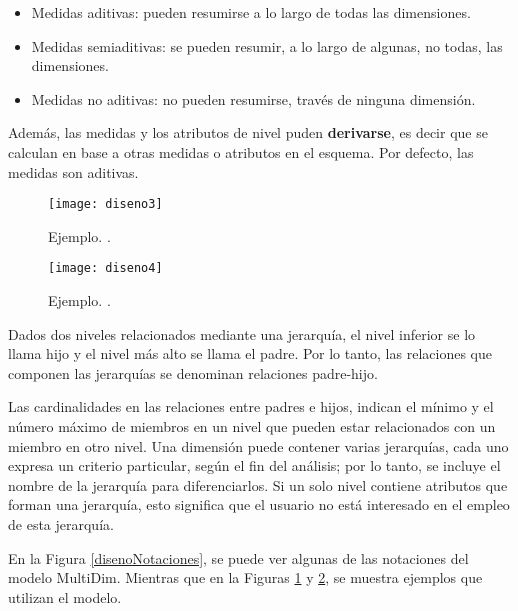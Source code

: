 \documentclass[a4paper,11pt]{article}
\begin{document}
\begin{itemize}
        \begin{itemize}
          \item Medidas aditivas: pueden resumirse a lo largo de todas las dimensiones.
          \item Medidas semiaditivas: se pueden resumir, a lo largo de algunas, no todas, las dimensiones.
          \item Medidas no aditivas: no pueden resumirse, través de ninguna dimensión.
        \end{itemize}
        Además, las medidas y los atributos de nivel puden \textbf{derivarse}, es decir que se calculan en base a otras medidas o atributos en el esquema.
        Por defecto, las medidas son aditivas.
      \end{itemize}
      
      \begin{figure}
        \begin{center}
          \texttt{[image: diseno3]}
          \caption{Ejemplo. \cite[p.~592]{VaismanZimanyi14}.}
          \label{disenoEj1}
        \end{center}
      \end{figure}
      
      \begin{figure}
        \begin{center}
          \texttt{[image: diseno4]}
          \caption{Ejemplo. \cite[p.~107]{VaismanZimanyi14}.}
          \label{disenoEj2}
        \end{center}
      \end{figure}
    
      Dados dos niveles relacionados mediante una jerarquía, el nivel inferior se lo llama hijo y el nivel más alto se llama el padre.
      Por lo tanto, las relaciones que componen las jerarquías se denominan relaciones padre-hijo.
      
      Las cardinalidades en las relaciones entre padres e hijos, indican el mínimo y el número máximo de miembros en un nivel que pueden estar relacionados
      con un miembro en otro nivel.
      Una dimensión puede contener varias jerarquías, cada uno expresa un criterio particular, según el fin del análisis; por lo tanto, se incluye el nombre
      de la jerarquía para diferenciarlos. Si un solo nivel contiene atributos que forman una jerarquía, esto significa que el usuario no está interesado
      en el empleo de esta jerarquía.
      
      En la Figura \ref{disenoNotaciones}, se puede ver algunas de las notaciones del modelo MultiDim. Mientras que en la Figuras \ref{disenoEj1} y \ref{disenoEj2},
      se muestra ejemplos que utilizan el modelo.
      
\end{document}
